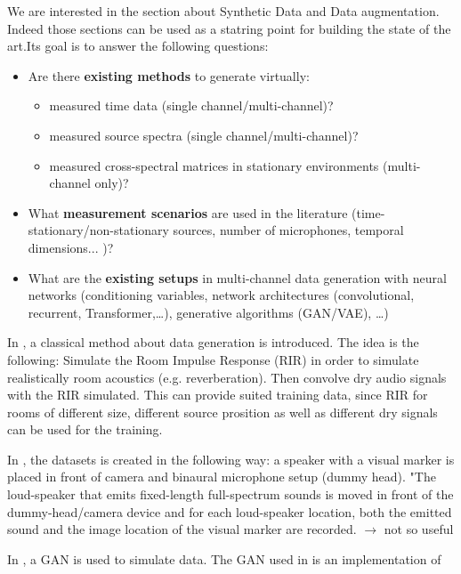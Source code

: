 \documentclass{article}
\begin{document}
We are interested in the section about Synthetic Data and Data augmentation. Indeed those sections can be used as a statring point for building the state of the art.Its goal is to answer the following questions:


\begin{itemize}
    \item Are there \textbf{existing methods} to generate virtually:
    \begin{itemize}
        \item measured time data (single channel/multi-channel)?
        \item measured source spectra (single channel/multi-channel)?
        \item measured cross-spectral matrices in stationary environments (multi-channel only)?
        
    \end{itemize}
    \item What \textbf{measurement scenarios} are used in the literature (time-stationary/non-stationary sources, number of microphones, temporal dimensions... )?
    \item What are the \textbf{existing setups} in multi-channel data generation with neural networks (conditioning variables, network architectures (convolutional, recurrent, Transformer,\dots), generative algorithms (GAN/VAE), \dots)
\end{itemize}

In \cite{grumiaux2022survey}, a classical method about data generation is introduced. The idea is the following: Simulate the Room Impulse Response (RIR) in order to simulate realistically room acoustics (e.g. reverberation). Then convolve dry audio signals with the RIR simulated. This can provide suited training data, since RIR for rooms of different size, different source prosition as well as different dry signals can be used for the training.

In  \cite{deleforge2015co}, the datasets is created in the following way: a speaker with a visual marker is placed in front of camera and binaural microphone setup (dummy head). "The loud-speaker that emits fixed-length full-spectrum sounds is moved in front of the dummy-head/camera device and for each loud-speaker location, both the emitted sound and the image location of the visual marker are recorded. $\rightarrow$ not so useful

In \cite{vargas2021improved}, a GAN is used to simulate data. The GAN used in \cite{vargas2021improved} is an implementation of \cite{neekhara2019expediting}
\end{document}
